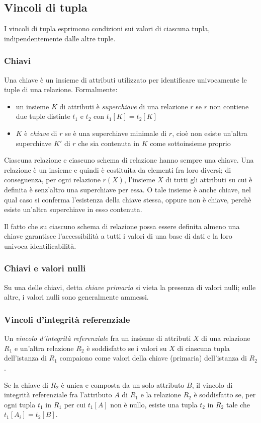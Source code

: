 \documentclass[11pt]{book}
\begin{document}
\subsection{Vincoli di tupla}
I vincoli di tupla esprimono condizioni sui valori di ciascuna tupla, indipendentemente dalle altre tuple.
\subsubsection{Chiavi}
Una chiave è un insieme di attributi utilizzato per identificare univocamente le tuple di una relazione.
Formalmente:
\begin{itemize}
    \item un insieme $K$ di attributi è \textit{superchiave} di una relazione $r$ se $r$ non contiene due tuple distinte 
    $t_1$ e $t_2$ con $t_1[K]=t_2[K]$
    \item $K$ è \textit{chiave} di $r$ se è una superchiave minimale di $r$, cioè non esiste un'altra superchiave $K'$ di 
    $r$ che sia contenuta in $K$ come sottoinsieme proprio
\end{itemize}
Ciascuna relazione e ciascuno schema di relazione hanno sempre una chiave. Una relazione è un insieme e quindi è costituita
da elementi fra loro diversi; di conseguenza, per ogni relazione $r(X)$, l'insieme $X$ di tutti gli attributi su cui è
definita è senz'altro una superchiave per essa. O tale insieme è anche chiave, nel qual caso si conferma l'esistenza della 
chiave stessa, oppure non è chiave, perchè esiste un'altra superchiave in esso contenuta.

Il fatto che su ciascuno schema di relazione possa essere definita almeno una chiave garantisce l'accessibilità a tutti 
i valori di una base di dati e la loro univoca identificabilità.
\subsubsection{Chiavi e valori nulli}
Su una delle chiavi, detta \textit{chiave primaria} si vieta la presenza di valori nulli; sulle altre, i valori nulli sono 
generalmente ammessi.
\subsubsection{Vincoli d'integrità referenziale}
Un \textit{vincolo d'integrità referenziale} fra un insieme di attributi $X$ di una relazione $R_1$ e un'altra relazione 
$R_2$ è soddisfatto se i valori su $X$ di ciascuna tupla dell'istanza di $R_1$ compaiono come valori della chiave (primaria)
dell'istanza di $R_2$.

Se la chiave di $R_2$ è unica e composta da un solo attributo $B$, il vincolo di integrità referenziale fra l'attributo 
$A$ di $R_1$ e la relazione $R_2$ è soddisfatto se, per ogni tupla $t_1$ in $R_1$ per cui $t_1[A]$ non è nullo, esiste 
una tupla $t_2$ in $R_2$ tale che $t_1[A_i]=t_2[B]$.
\end{document}
